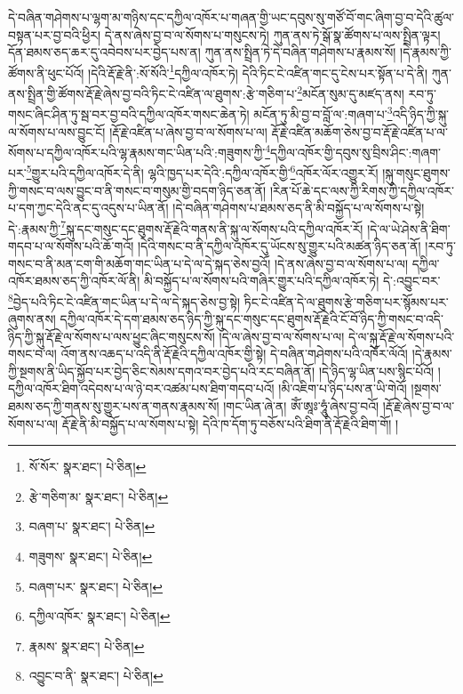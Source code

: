 དེ་བཞིན་གཤེགས་པ་ལྷག་མ་གཉིས་དང་དཀྱིལ་འཁོར་པ་གཞན་གྱི་ཡང་དབུས་སུ་གཙོ་བོ་གང་ཞིག་བྱ་བ་དེའི་ཚུལ་བསྟན་པར་བྱ་བའི་ཕྱིར། དེ་ནས་ཞེས་བྱ་བ་ལ་སོགས་པ་གསུངས་ཏེ། ཀུན་ནས་ཏེ་སྒོ་སྣ་ཚོགས་པ་ལས་སྤྲིན་ལྟར། དོན་ཐམས་ཅད་ཆར་དུ་འབེབས་པར་བྱེད་པས་ན། ཀུན་ནས་སྤྲིན་ཏེ་དེ་བཞིན་གཤེགས་པ་རྣམས་སོ། །དེ་རྣམས་ཀྱི་ཚོགས་ནི་ཕུང་པོའོ། །དེའི་རྡོ་རྗེ་ནི་:སོ་སོའི་\footnote{སོ་སོར་  སྣར་ཐང་།  པེ་ཅིན། }དཀྱིལ་འཁོར་ཏེ། དེའི་ཏིང་ངེ་འཛིན་གང་དུ་ངེས་པར་སྟོན་པ་དེ་ནི། ཀུན་ནས་སྤྲིན་གྱི་ཚོགས་རྡོ་རྗེ་ཞེས་བྱ་བའི་ཏིང་ངེ་འཛིན་ལ་ཐུགས་:རྩེ་གཅིག་པ་\footnote{རྩེ་གཅིག་མ་  སྣར་ཐང་།  པེ་ཅིན། }མངོན་སུམ་དུ་མཛད་ནས། རབ་ཏུ་གསང་ཞིང་ཤིན་ཏུ་སྦ་བར་བྱ་བའི་དཀྱིལ་འཁོར་གསང་ཆེན་ཏེ། མངོན་ཏུ་མི་བྱ་བ་བློ་ལ་:གཞག་པ་\footnote{བཞག་པ་  སྣར་ཐང་།  པེ་ཅིན། }འདི་ཉིད་ཀྱི་སྐུ་ལ་སོགས་པ་ལས་བྱུང་ངོ། །རྡོ་རྗེ་འཛིན་པ་ཞེས་བྱ་བ་ལ་སོགས་པ་ལ། རྡོ་རྗེ་འཛིན་མཆོག་ཅེས་བྱ་བ་རྡོ་རྗེ་འཛིན་པ་ལ་སོགས་པ་དཀྱིལ་འཁོར་པའི་ལྷ་རྣམས་གང་ཡིན་པའི་:གཟུགས་ཀྱི་\footnote{གཟུགས་  སྣར་ཐང་།  པེ་ཅིན། }དཀྱིལ་འཁོར་གྱི་དབུས་སུ་བྲིས་ཤིང་:གཞག་པར་\footnote{བཞག་པར་  སྣར་ཐང་།  པེ་ཅིན། }གྱུར་པའི་དཀྱིལ་འཁོར་དེ་ནི། ལྷའི་ཁྱད་པར་དེའི་:དཀྱིལ་འཁོར་གྱི་\footnote{དཀྱིལ་འཁོར་  སྣར་ཐང་།  པེ་ཅིན། }འཁོར་ལོར་འགྱུར་རོ། །སྐུ་གསུང་ཐུགས་ཀྱི་གསང་བ་ལས་བྱུང་བ་ནི་གསང་བ་གསུམ་གྱི་བདག་ཉིད་ཅན་ནོ། །རིན་པོ་ཆེ་དང་ལས་ཀྱི་རིགས་ཀྱི་དཀྱིལ་འཁོར་པ་དག་ཀྱང་དེའི་ནང་དུ་འདུས་པ་ཡིན་ནོ། །དེ་བཞིན་གཤེགས་པ་ཐམས་ཅད་ནི་མི་བསྐྱོད་པ་ལ་སོགས་པ་སྟེ། དེ་:རྣམས་ཀྱི་\footnote{རྣམས་  སྣར་ཐང་།  པེ་ཅིན། }སྐུ་དང་གསུང་དང་ཐུགས་རྡོ་རྗེའི་གནས་ནི་སྐུ་ལ་སོགས་པའི་དཀྱིལ་འཁོར་རོ། །དེ་ལ་ཡེ་ཤེས་ནི་ཐིག་གདབ་པ་ལ་སོགས་པའི་ཆོ་གའོ། །དེའི་གསང་བ་ནི་དཀྱིལ་འཁོར་དུ་ཡོངས་སུ་གྱུར་པའི་མཚན་ཉིད་ཅན་ནོ། །རབ་ཏུ་གསང་བ་ནི་མན་ངག་གི་མཆོག་གང་ཡིན་པ་དེ་ལ་དེ་སྐད་ཅེས་བྱའོ། །དེ་ནས་ཞེས་བྱ་བ་ལ་སོགས་པ་ལ། དཀྱིལ་འཁོར་ཐམས་ཅད་ཀྱི་འཁོར་ལོ་ནི། མི་བསྐྱོད་པ་ལ་སོགས་པའི་གཞིར་གྱུར་པའི་དཀྱིལ་འཁོར་ཏེ། དེ་:འབྱུང་བར་\footnote{འབྱུང་བ་ནི་  སྣར་ཐང་།  པེ་ཅིན། }བྱེད་པའི་ཏིང་ངེ་འཛིན་གང་ཡིན་པ་དེ་ལ་དེ་སྐད་ཅེས་བྱ་སྟེ། ཏིང་ངེ་འཛིན་དེ་ལ་ཐུགས་རྩེ་གཅིག་པར་སྙོམས་པར་ཞུགས་ནས། དཀྱིལ་འཁོར་དེ་དག་ཐམས་ཅད་ཉིད་ཀྱི་སྐུ་དང་གསུང་དང་ཐུགས་རྡོ་རྗེའི་ངོ་བོ་ཉིད་ཀྱི་གསང་བ་འདི་ཉིད་ཀྱི་སྐུ་རྡོ་རྗེ་ལ་སོགས་པ་ལས་ཕྱུང་ཞིང་གསུངས་སོ། །དེ་ལ་ཞེས་བྱ་བ་ལ་སོགས་པ་ལ། དེ་ལ་སྐུ་རྡོ་རྗེ་ལ་སོགས་པའི་གསང་བ་ལ། འོག་ནས་འཆད་པ་འདི་ནི་རྡོ་རྗེའི་དཀྱིལ་འཁོར་གྱི་སྟེ། དེ་བཞིན་གཤེགས་པའི་འཁོར་ལོའོ། །དེ་རྣམས་ཀྱི་སྔགས་ནི་ཡིད་སྐྱོབ་པར་བྱེད་ཅིང་སེམས་དགའ་བར་བྱེད་པའི་རང་བཞིན་ནོ། །དེ་ཉིད་ལྷ་ཡིན་པས་སྙིང་པོའོ། །དཀྱིལ་འཁོར་ཐིག་འདེབས་པ་ལ་ཉེ་བར་འཚམ་པས་ཐིག་གདབ་པའོ། །མི་འཇིག་པ་ཉིད་པས་ན་ཡི་གེའོ། །སྔགས་ཐམས་ཅད་ཀྱི་གནས་སུ་གྱུར་པས་ན་གནས་རྣམས་སོ། །གང་ཡིན་ཞེ་ན། ཨོཾ་ཨཱཿ་ཧཱུཾ་ཞེས་བྱ་བའོ། །རྡོ་རྗེ་ཞེས་བྱ་བ་ལ་སོགས་པ་ལ། རྡོ་རྗེ་ནི་མི་བསྐྱོད་པ་ལ་སོགས་པ་སྟེ། དེའི་ཁ་དོག་ཏུ་བཅོས་པའི་ཐིག་ནི་རྡོ་རྗེའི་ཐིག་གོ། །
